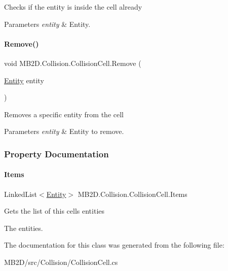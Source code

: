 Checks if the entity is inside the cell already 


\begin{DoxyParams}{Parameters}
{\em entity} & Entity.\\
\hline
\end{DoxyParams}
\hypertarget{class_m_b2_d_1_1_collision_1_1_collision_cell_a064f540f907885b4224119308cbf1761}{}\label{class_m_b2_d_1_1_collision_1_1_collision_cell_a064f540f907885b4224119308cbf1761} 
\paragraph{\texorpdfstring{Remove()}{Remove()}}
{\footnotesize\ttfamily void M\+B2\+D.\+Collision.\+Collision\+Cell.\+Remove (\begin{DoxyParamCaption}\item[{\hyperlink{class_m_b2_d_1_1_entity_component_1_1_entity}{Entity}}]{entity }\end{DoxyParamCaption})\hspace{0.3cm}{\ttfamily [inline]}}



Removes a specific entity from the cell 


\begin{DoxyParams}{Parameters}
{\em entity} & Entity to remove.\\
\hline
\end{DoxyParams}


\subsubsection{Property Documentation}
\hypertarget{class_m_b2_d_1_1_collision_1_1_collision_cell_ab893dad8ce4d09c5ab38a5da93145755}{}\label{class_m_b2_d_1_1_collision_1_1_collision_cell_ab893dad8ce4d09c5ab38a5da93145755} 
\paragraph{\texorpdfstring{Items}{Items}}
{\footnotesize\ttfamily Linked\+List$<$\hyperlink{class_m_b2_d_1_1_entity_component_1_1_entity}{Entity}$>$ M\+B2\+D.\+Collision.\+Collision\+Cell.\+Items\hspace{0.3cm}{\ttfamily [get]}}



Gets the list of this cells entities 

The entities.

The documentation for this class was generated from the following file\+:\begin{DoxyCompactItemize}
\item 
M\+B2\+D/src/\+Collision/Collision\+Cell.\+cs\end{DoxyCompactItemize}
